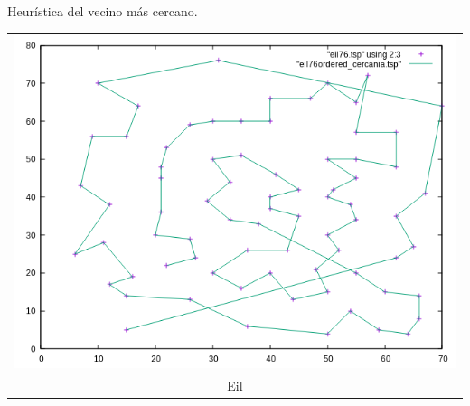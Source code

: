 \documentclass[10pt, xcolor=table]{beamer}
\begin{document}
\begin{frame}[fragile]{Heurística del vecino más cercano. }
\begin{center}
\begin{tabular}{c}
\includegraphics[scale=0.23]{./Images/eil_cercania.png} \\
Eil
\end{tabular}
\end{center}
\end{frame}
\end{document}
